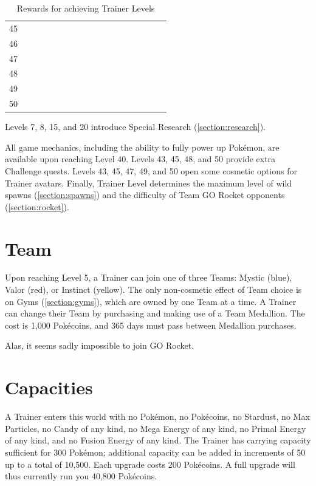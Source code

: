 \begin{table}[t]
\begin{center}
\begin{tabular}{l g c g c g c g c g c g c g c g c g}
   45 &    & & &    &    & & & &   &    &    &    & &   &   &   & \\
   46 &    & & &    &    & & & &   &    &    &    & &   &   &   & \\
   47 &    & & &    &    & & & &   &    &    &    & &   &   &   & \\
   48 &    & & &    &    & & & &   &    &    &    & &   &   &   & \\
   49 &    & & &    &    & & & &   &    &    &    & &   &   &   & \\
   50 &    & & &    &    & & & &   &    &    &    & &   &   &   & \\
\end{tabular}
\caption{Rewards for achieving Trainer Levels}
\label{table:levelitems}
\end{center}
\end{table}
Levels 7, 8, 15, and 20 introduce Special Research (\autoref{section:research}).

All game mechanics, including the ability to fully power up Pokémon,
 are available upon reaching Level 40.
Levels 43, 45, 48, and 50 provide extra Challenge quests.
Levels 43, 45, 47, 49, and 50 open some cosmetic options for Trainer avatars.
Finally, Trainer Level determines the maximum level of wild spawns
  (\autoref{section:spawns}) and the difficulty of Team GO Rocket
  opponents (\autoref{section:rocket}).

\section{Team}
Upon reaching Level 5, a Trainer can join one of three Teams: Mystic (blue),
  Valor (red), or Instinct (yellow).
The only non-cosmetic effect of Team choice is on Gyms (\autoref{section:gyms}), which
  are owned by one Team at a time.
A Trainer can change their Team by purchasing and making use of a Team Medallion.
The cost is 1,000 Pokécoins, and 365 days must pass between Medallion purchases.

Alas, it seems sadly impossible to join GO Rocket.

\section{Capacities}
A Trainer enters this world with no Pokémon, no Pokécoins, no Stardust,
  no Max Particles, no Candy of any kind, no Mega Energy of any kind,
  no Primal Energy of any kind, and no Fusion Energy of any kind.
The Trainer has carrying capacity sufficient for 300 Pokémon; additional
  capacity can be added in increments of 50 up to a total of 10,500.
Each upgrade costs 200 Pokécoins.
A full upgrade will thus currently run you 40,800 Pokécoins.


